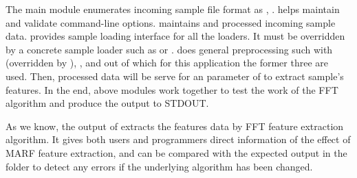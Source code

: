 The main  module enumerates incoming sample file format as
, .  helps maintain and validate
command-line options.  maintains and processed incoming
sample data.  provides sample loading interface for
all the {\marf} loaders. It must be overridden by a concrete sample loader
such as  or .  does general
preprocessing such with  (overridden by ), ,
 and  out of which for this application the
former three are used. Then, processed data will be serve for an parameter of 
to extract sample's features. In the end, above modules work together to test the work of the FFT
algorithm and produce the output to STDOUT.

As we know, the output of  extracts the features data by FFT feature extraction algorithm.
It gives both users and programmers direct information of the effect of MARF feature extraction,
and can be compared with the expected output in the  folder to detect any errors
if the underlying algorithm has been changed.

